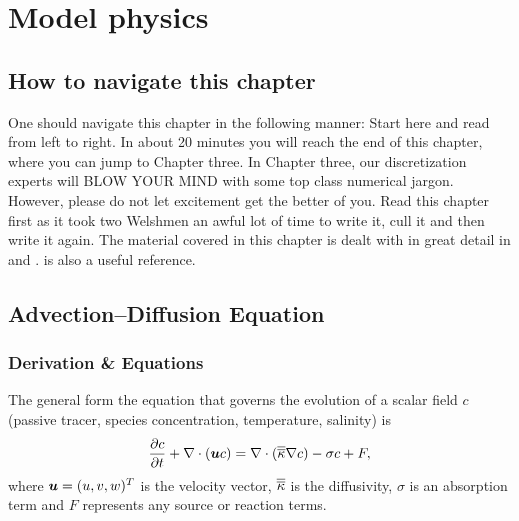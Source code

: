 \chapter{Model physics}\label{chap:model_physics}

\section{How to navigate this chapter}
One should navigate this chapter in the following manner: Start here and read from left to right. In about 20 minutes you will reach the end of this chapter, where you can jump to Chapter three. In Chapter three, our discretization experts will BLOW YOUR MIND with some top class numerical jargon. However, please do not let excitement get the better of you. Read this chapter first as it took two Welshmen an awful lot of time to write it, cull it and then write it again. The material covered in this chapter is dealt with in great detail in \citet{batchelor1967} and \citet{landau}. \cite{cushman1994} is also a useful reference.

\section{Advection--Diffusion Equation}\label{Sect:MP-AdvdifEqn}

\subsection{Derivation \& Equations}

The general form the equation that governs the evolution of a scalar field $c$
(\eg passive tracer, species concentration, temperature, salinity) is
\begin{equation}\label{eq:general_scalar_eqn}
\frac{\partial c}{\partial t} + \nabla\cdot({\mbox{\boldmath$u$}} c) = \nabla\cdot(\overline{\overline{\kappa}}\nabla c) - \sigma c + F,
\end{equation}
where ${\mbox{\boldmath$u$}}=(u,v,w)^{T}$ is the velocity vector, $\overline{\overline{\kappa}}$ is the diffusivity, $\sigma$ is an absorption term and $F$ represents any source or reaction terms.

